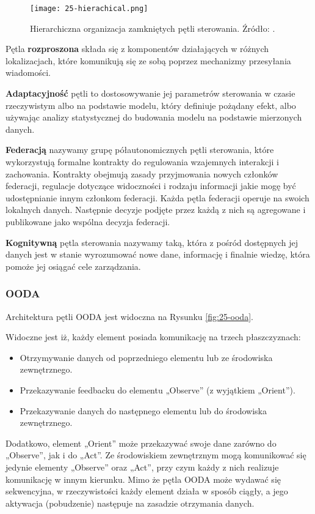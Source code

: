 \begin{figure}[!h]
    \centering \texttt{[image: 25-hierachical.png]}
    \caption{Hierarchiczna organizacja zamkniętych pętli sterowania. Źródło: \cite{etsieni2024}.}\label{fig:25-hierachical}
\end{figure}

Pętla \textbf{rozproszona} składa się z komponentów działających w różnych lokalizacjach, które komunikują się ze sobą poprzez mechanizmy przesyłania wiadomości. 

\textbf{Adaptacyjność} pętli to dostosowywanie jej parametrów sterowania w czasie rzeczywistym albo na podstawie modelu, który definiuje pożądany efekt, albo używając analizy statystycznej do budowania modelu na podstawie mierzonych danych.

\textbf{Federacją} nazywamy grupę półautonomicznych pętli sterowania, które wykorzystują formalne kontrakty do regulowania wzajemnych interakcji i zachowania. Kontrakty obejmują zasady przyjmowania nowych członków federacji, regulacje dotyczące widoczności i rodzaju informacji jakie mogę być udostępnianie innym członkom federacji. Każda pętla federacji operuje na swoich lokalnych danych. Następnie decyzje podjęte przez każdą z nich są agregowane i publikowane jako wspólna decyzja federacji.

\textbf{Kognitywną} pętla sterowania nazywamy taką, która z pośród dostępnych jej danych jest w stanie wyrozumować nowe dane, informację i finalnie wiedzę, która pomoże jej osiągać cele zarządzania.

\subsubsection{OODA}
Architektura pętli OODA \cite{boyd1995} jest widoczna na Rysunku \ref{fig:25-ooda}.

Widoczne jest iż, każdy element posiada komunikację na trzech płaszczyznach:
\begin{itemize}
    \item Otrzymywanie danych od poprzedniego elementu lub ze środowiska zewnętrznego.
    \item Przekazywanie feedbacku do elementu „Observe” (z wyjątkiem „Orient”).
    \item Przekazywanie danych do następnego elementu lub do środowiska zewnętrznego.
\end{itemize}

Dodatkowo, element „Orient” może przekazywać swoje dane zarówno do „Observe”, jak i do „Act”. Ze środowiskiem zewnętrznym mogą komunikować się jedynie elementy „Observe” oraz „Act”, przy czym każdy z nich realizuje komunikację w innym kierunku. Mimo że pętla OODA może wydawać się sekwencyjna, w rzeczywistości każdy element działa w sposób ciągły, a jego aktywacja (pobudzenie) następuje na zasadzie otrzymania danych.


